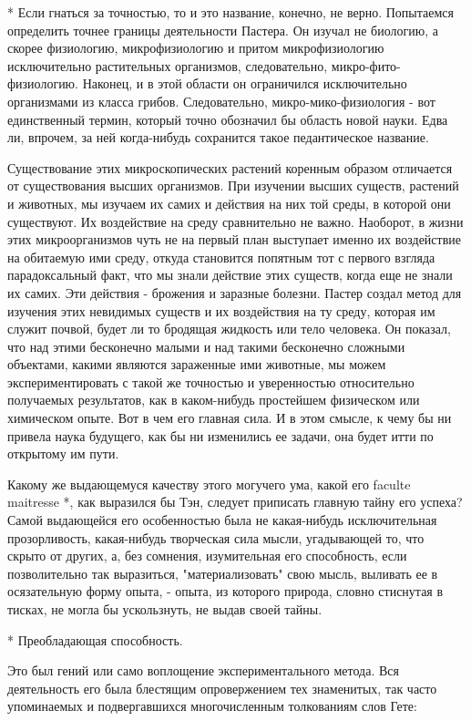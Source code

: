 * Если гнаться за точностью, то и это название, конечно, не верно.
Попытаемся определить точнее границы деятельности Пастера. Он изучал
не биологию, а скорее физиологию, микрофизиологию и притом
микрофизиологию исключительно растительных организмов, следовательно,
микро-фито-физиологию. Наконец, и в этой области он ограничился
исключительно организмами из класса грибов. Следовательно,
микро-мико-физиология - вот единственный термин, который точно
обозначил бы область новой науки. Едва ли, впрочем, за ней
когда-нибудь сохранится такое педантическое название.

Существование этих микроскопических растений коренным образом отличается
от  существования  высших  организмов.  При  изучении  высших   существ,
растений и животных, мы изучаем их самих и действия на них той среды,  в
которой они существуют. Их воздействие  на среду сравнительно не  важно.
Наоборот, в жизни этих микроорганизмов чуть не на первый план  выступает
именно их воздействие на обитаемую ими среду, откуда становится попятным
тот с первого взгляда  парадоксальный факт, что  мы знали действие  этих
существ, когда еще не знали их самих. Эти действия - брожения и заразные
болезни. Пастер создал метод  для изучения этих  невидимых существ и  их
воздействия на ту среду, которая им служит почвой, будет ли то  бродящая
жидкость или тело человека. Он показал, что над этими бесконечно  малыми
и над такими бесконечно  сложными объектами, какими являются  зараженные
ими животные,  мы  можем  экспериментировать  с  такой  же  точностью  и
уверенностью относительно  получаемых  результатов, как  в  каком-нибудь
простейшем физическом или химическом опыте. Вот в чем его главная  сила.
И в  этом  смысле, к  чему  бы ни  привела  наука будущего,  как  бы  ни
изменились ее задачи, она будет итти по открытому им пути.

Какому же выдающемуся  качеству этого  могучего ума,  какой его  faculte
maitresse *, как выразился бы  Тэн, следует приписать главную тайну  его
успеха?  Самой  выдающейся   его  особенностью   была  не   какая-нибудь
исключительная  прозорливость,  какая-нибудь   творческая  сила   мысли,
угадывающей то, что скрыто от других, а, без сомнения, изумительная  его
способность, если позволительно  так выразиться, "материализовать"  свою
мысль, выливать  ее в  осязательную форму  опыта, -  опыта, из  которого
природа, словно стиснутая в  тисках, не могла  бы ускользнуть, не  выдав
своей тайны.

* Преобладающая способность.

Это  был  гений  или  само  воплощение  экспериментального  метода.  Вся
деятельность его была блестящим опровержением тех знаменитых, так  часто
упоминаемых и подвергавшихся многочисленным толкованиям слов Гете:


